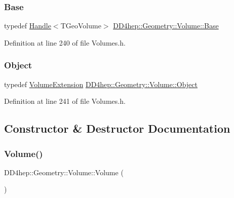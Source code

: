 \subsubsection{\texorpdfstring{Base}{Base}}
{\footnotesize\ttfamily typedef \hyperlink{class_d_d4hep_1_1_handle}{Handle}$<$T\+Geo\+Volume$>$ \hyperlink{class_d_d4hep_1_1_geometry_1_1_volume_ac9545eb97e81ed894b7192a26e4ef5a9}{D\+D4hep\+::\+Geometry\+::\+Volume\+::\+Base}}



Definition at line 240 of file Volumes.\+h.

\hypertarget{class_d_d4hep_1_1_geometry_1_1_volume_a12968f95257e99e277f773ccf6d58ee5}{}\label{class_d_d4hep_1_1_geometry_1_1_volume_a12968f95257e99e277f773ccf6d58ee5} 
\subsubsection{\texorpdfstring{Object}{Object}}
{\footnotesize\ttfamily typedef \hyperlink{class_d_d4hep_1_1_geometry_1_1_volume_extension}{Volume\+Extension} \hyperlink{class_d_d4hep_1_1_geometry_1_1_volume_a12968f95257e99e277f773ccf6d58ee5}{D\+D4hep\+::\+Geometry\+::\+Volume\+::\+Object}}



Definition at line 241 of file Volumes.\+h.



\subsection{Constructor \& Destructor Documentation}
\hypertarget{class_d_d4hep_1_1_geometry_1_1_volume_a5e8cfa8694162b1e3be9401e64667370}{}\label{class_d_d4hep_1_1_geometry_1_1_volume_a5e8cfa8694162b1e3be9401e64667370} 
\subsubsection{\texorpdfstring{Volume()}{Volume()}\hspace{0.1cm}{\footnotesize\ttfamily [1/6]}}
{\footnotesize\ttfamily D\+D4hep\+::\+Geometry\+::\+Volume\+::\+Volume (\begin{DoxyParamCaption}{ }\end{DoxyParamCaption})\hspace{0.3cm}{\ttfamily [inline]}}



